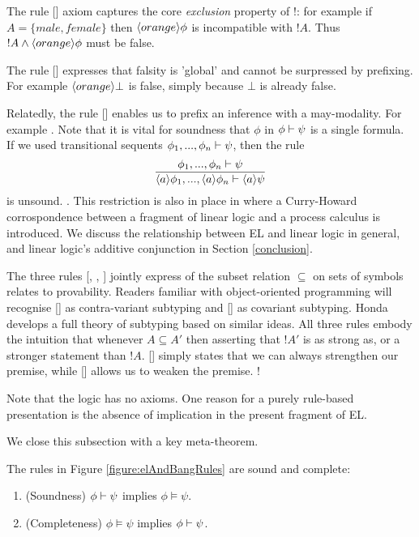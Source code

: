 The rule [] axiom captures the core
\emph{exclusion} property of !: for example if $A = \{male, female\}$
then $\langle orange \rangle \phi$ is incompatible with $!A$. Thus $!A \land
\langle orange \rangle \phi$ must be false.

The rule [] expresses that falsity is 'global'
  and cannot be surpressed by prefixing. For example
  $\langle orange \rangle \bot$ is false, simply because $\bot$ is already
  false.

Relatedly, the rule [] enables us to
prefix an inference with a may-modality. For example . Note that it is vital for soundness that $\phi$ in $\phi
\vdash \psi$ is a single formula. If we used transitional sequents $\phi_1, ..., \phi_n \vdash \psi$,
then the rule
\[
   \frac{\displaystyle{ 
     \phi_1, ..., \phi_n \vdash\psi
    }}{\displaystyle{ 
     \langle a \rangle \phi_1, ..., \langle a \rangle \phi_n \vdash\langle a \rangle \psi
    }}
\]
is unsound. . This
restriction is also in place in \cite{GaySJ:typcalosp} where a
Curry-Howard corrospondence between a fragment of linear logic
\cite{GirardJY:linlog,GirardJY:protyp} and a process calculus is
introduced. We discuss the relationship between EL and linear logic in
general, and linear logic's additive conjunction in Section
\ref{conclusion}.


The three rules [, ,
  ] jointly express of the subset relation
$\subseteq$ on sets of symbols relates to provability. Readers
familiar with object-oriented programming will recognise
[] as contra-variant subtyping and [] as covariant subtyping. Honda \cite{HondaK:thetypftpc}
develops a full theory of subtyping based on similar ideas.  All three
rules embody the intuition that whenever $A \subseteq A'$ then
asserting that $!A'$ is as strong as, or a stronger statement than
$!A$. [] simply states that we can always strengthen
our premise, while [] allows us to weaken the
premise. !

Note that the logic has no axioms. One reason for a purely rule-based
presentation is the absence of implication in the present fragment of
EL. 

We close this subsection with a key meta-theorem.

\begin{theorem}\label{theorem:elAndBang:soundComplete}
The rules in Figure \ref{figure:elAndBangRules} are sound and complete:
\begin{enumerate}

\item\label{theorem:elAndBang:sound} (Soundness) $\phi \vdash \psi$ implies $\phi \models \psi$.

\item\label{theorem:elAndBang:complete} (Completeness) $\phi \models \psi$ implies $\phi \vdash \psi$.

\end{enumerate}
\end{theorem}

